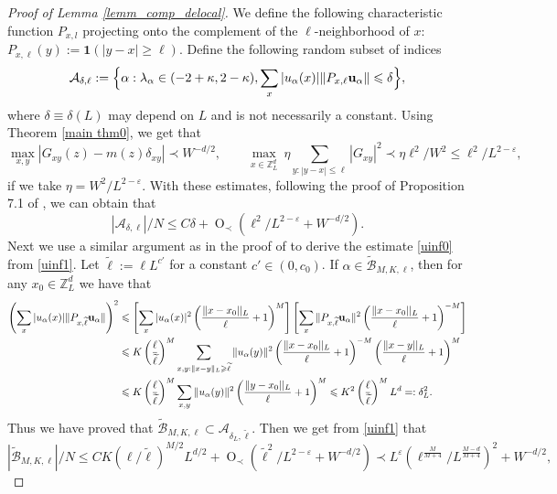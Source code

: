 \documentclass{article}
\newcommand{\1}{\mathds{1}}
\numberwithin{equation}{section}
\newcommand{\bu}{{\bf{u}}}
\newcommand{\al}{\alpha}
\newcommand{\be}{\begin{equation}}
\newcommand{\ee}{\end{equation}}
\newcommand{\e}{{\varepsilon}}
\renewcommand{\cal}{\mathcal}
\newcommand{\wt}{\widetilde}
\renewcommand{\leq}{\leqslant}
\renewcommand{\geq}{\geqslant}
\renewcommand{\le}{\leq}
\renewcommand{\ge}{\geq}
\newcommand{\Z}{\mathbb{Z}}
\DeclareMathOperator{\OO}{O}
\theoremstyle{plain} %
\theoremstyle{remark}
\begin{document}
\begin{proof}[Proof of Lemma \ref{lemm_comp_delocal}]
	We define the following characteristic function $P_{x,l}$ projecting onto the complement of the $\ell$-neighborhood of $x$: $P_{x,\ell}(y):=\mathbf 1(|y-x|\ge \ell).$ 	Define the following random subset of indices  
	$$\mathcal A_{\delta, \ell}:=\Big\{ \alpha: \lambda_\alpha \in (-2+\kappa, 2-\kappa), \sum_x |u_\alpha(x)|\|P_{x,\ell}\bu_{\al}\|\le \delta \Big\} , $$
	where $\delta \equiv \delta(L)$ may depend on $L$ and is not necessarily a constant. Using Theorem \ref{main thm0}, we get that 
	$$\max_{x,y}|G_{xy}(z)-m(z)\delta_{xy}|\prec W^{-d/2},\quad  \quad \max_{x\in \Z_L^d}\ \eta \sum_{y:|y-x|\le \ell}|G_{xy}|^2 \prec \eta {\ell^2}/{W^2} \le  \ell^2/L^{2-\e},$$
	if we take $\eta = W^{2}/L^{2-\e}$. 	With these estimates, following the proof of Proposition 7.1 of \cite{delocal}, we can obtain that 
	\be\label{uinf1}  {|\mathcal A_{\delta, \ell }| }/{N} \le C\delta + \OO_\prec \left( \ell^2/L^{2-\e}+W^{-d/2}\right).\ee
	Next we use a similar argument as in the proof of \cite[Corollary 3.4]{ErdKno2011} to derive the estimate \eqref{uinf0} from \eqref{uinf1}. %
	Let $\wt \ell:= \ell L^{c'}$ for a constant $c'\in (0,c_0)$. If $\al\in  \wt{\mathcal B}_{M,K,\ell} $, then for any $x_0\in \Z_L^d$ we have that 
	\begin{align*}
		\left(\sum_x |u_\alpha(x)|\|P_{x,\wt\ell}\bu_{\al}\|\right)^2& \le \left[\sum_x |u_\alpha(x)|^2 \left(\frac{\|x-x_0||_L}{\ell}+1\right)^M\right] \left[\sum_x \|P_{x,\wt\ell}\bu_{\al}\|^2  \left(\frac{\|x-x_0||_L}{\ell}+1\right)^{-M}\right] \\
		& \le K \left( \frac{\ell}{\wt\ell}\right)^M\sum_{x,y:\|x-y\|_L \ge \wt\ell} \| u_{\al}(y)\|^2  \left(\frac{\|x-x_0||_L}{\ell}+1\right)^{-M}\left(\frac{\|x-y||_L}{\ell}+1\right)^M \\
		& \le  K\left( \frac{\ell}{\wt\ell}\right)^M\sum_{x,y } \| u_{\al}(y)\|^2   \left(\frac{\|y-x_0||_L}{\ell}+1\right)^M \le  K^2  \left( \frac{\ell}{\wt\ell}\right)^M L^d=:\delta_L^2 .
	\end{align*}
	Thus we have proved that $\wt{\mathcal B}_{ M,K,\ell}\subset \cal A_{\delta_L, \wt\ell}$. Then we get from \eqref{uinf1} that
	$$\left|\wt{\mathcal B}_{M,K,\ell}\right|/N \le CK\left( {\ell}/{\wt\ell}\right)^{M/2} L^{d/2}+\OO_\prec \left(  {\wt\ell^2}/{L^{2-\e}}+W^{-d/2}\right)  \prec L^\e \left(  {\ell^{\frac{M}{M+4}}}/{L^{\frac{M-d}{M+4}}}\right)^2 +W^{-d/2},$$

\end{proof}
\end{document}
